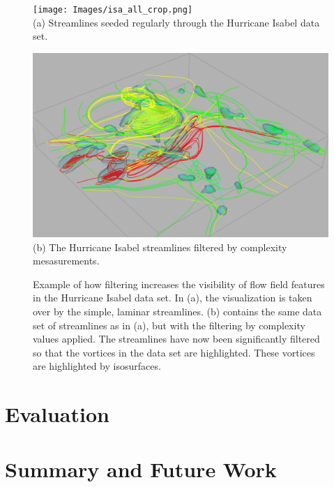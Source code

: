 \documentclass[journal]{vgtc}                %
\begin{document}
\begin{figure}[t]
		\begin{minipage}{1\linewidth}
			\texttt{[image: Images/isa\_all\_crop.png]}\\(a) Streamlines seeded regularly through the Hurricane Isabel data set. \vspace{0.2em}
		\end{minipage}
		\begin{minipage}{1\linewidth}
			\includegraphics[height = .62\linewidth]{Images/isa_iso_crop.png}\\(b) The Hurricane Isabel streamlines filtered by complexity mesasurements. \vspace{0.2em}
		\end{minipage}
	\caption{Example of how filtering increases the visibility of flow field features in the Hurricane Isabel data set. In (a), the visualization is taken over by the simple, laminar streamlines. (b) contains the same data set of streamlines as in (a), but with the filtering by complexity values applied. The streamlines have now been significantly filtered so that the vortices in the data set are highlighted. These vortices are highlighted by isosurfaces.}
	\label{fig:isa_lines}
\end{figure}

\section{Evaluation} \label{sec:evaluations}

\section{Summary and Future Work}



\end{document}
